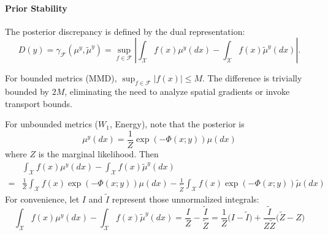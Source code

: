 \documentclass[twoside,11pt]{article}
\begin{document}
\paragraph{Prior Stability} The posterior discrepancy is defined by the dual representation:
$$D(y) = \gamma_{\mathcal{F}}(\mu^y, \tilde{\mu}^y) = \sup_{f \in \mathcal{F}} \left| \int_{\mathcal{X}} f(x) \mu^y(dx) - \int_{\mathcal{X}} f(x) \tilde{\mu}^y(dx) \right|.$$

For bounded metrics (MMD), $\sup_{f \in \mathcal{F}} |f(x)| \le M$. The difference is trivially bounded by $2M$, eliminating the need to analyze spatial gradients or invoke transport bounds.

For unbounded metrics ($W_1$, Energy), note that the posterior is $$\mu^y(dx) = \frac{1}{Z} \exp(-\Phi(x;y)) \mu(dx)$$
where $Z$ is the marginal likelihood. Then 
$$
    \begin{aligned}
        & \int_{\mathcal{X}} f(x) \mu^y(dx) - \int_{\mathcal{X}} f(x) \tilde{\mu}^y(dx) \\ 
        = & \frac{1}{Z} \int_{\mathcal{X}} f(x) \exp(-\Phi(x;y)) \mu(dx) - \frac{1}{\tilde{Z}} \int_{\mathcal{X}} f(x) \exp(-\Phi(x;y)) \tilde{\mu}(dx)
    \end{aligned}
$$
For convenience, let $I$ and $\tilde{I}$ represent those unnormalized integrals:
$$\int_{\mathcal{X}} f(x) \mu^y(dx) - \int_{\mathcal{X}} f(x) \tilde{\mu}^y(dx)= \frac{I}{Z} - \frac{\tilde{I}}{\tilde{Z}}= \frac{1}{Z} \big( I - \tilde{I} \big) + \frac{\tilde{I}}{Z \tilde{Z}} \big( \tilde{Z} - Z \big)$$
\end{document}
